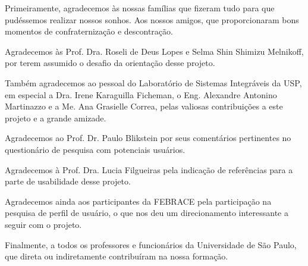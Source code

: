 

Primeiramente, agradecemos às nossas famílias que fizeram tudo para que pudéssemos realizar nossos sonhos. Aos nossos amigos, que proporcionaram bons momentos de confraternização e descontração.

Agradecemos às Prof. Dra. Roseli de Deus Lopes e Selma Shin Shimizu Melnikoff, por terem assumido o desafio da orientação desse projeto.

Também agradecemos ao pessoal do Laboratório de Sistemas Integráveis da USP, em especial a Dra. Irene Karaguilla Ficheman, o Eng. Alexandre Antonino Martinazzo e a Me. Ana Grasielle Correa, pelas valiosas contribuições a este projeto e a grande amizade. 

Agradecemos ao Prof. Dr. Paulo Blikstein por seus comentários pertinentes no questionário de pesquisa com potenciais usuários.

Agradecemos à Prof. Dra. Lucia Filgueiras pela indicação de referências para a parte de usabilidade desse projeto.

Agradecemos ainda aos participantes da FEBRACE pela participação na pesquisa de perfil de usuário, o que nos deu um direcionamento interessante a seguir com o projeto.

Finalmente, a todos os professores e funcionários da Universidade de São Paulo, que direta ou indiretamente contribuíram na nossa formação.
